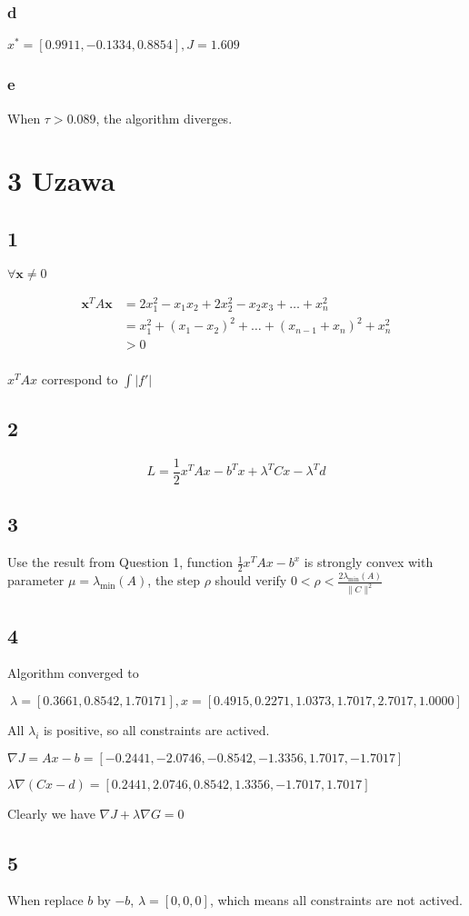\documentclass{article}
\begin{document}
\subsubsection*{d}
$x^* = [0.9911,   -0.1334,    0.8854], J=1.609$
\subsubsection*{e}
When $\tau > 0.089$, the algorithm diverges.
\section*{3 Uzawa}
\subsection*{1}
$\forall \mathbf{x}\neq 0$ 

\begin{equation*}
\begin{split}
\mathbf{x}^T A \mathbf{x} &= 2x_1^2 - x_1x_2 +2x_2^2 - x_2x_3+\dots+x_n^2\\
&= x_1^2 + (x_1-x_2)^2 + \dots + (x_{n-1}+x_n)^2 + x_n^2\\
&> 0\\
\end{split}
\end{equation*}

$x^TAx$ correspond to $\int | f' |$
\subsection*{2}
\begin{equation*}
L = \frac{1}{2} x^TAx - b^Tx +\lambda^TCx-\lambda^Td
\end{equation*}

\subsection*{3}
Use the result from Question 1, function $\frac{1}{2}x^TAx-b^x$ is strongly convex with parameter $\mu=\lambda_{\text{min}}(A)$, the step $\rho$ should verify $0<\rho<\frac{2\lambda_{\text{min}}(A)}{\lVert C\rVert^2}$

\subsection*{4}
Algorithm converged to

$$
\lambda = [0.3661, 0.8542, 1.70171], x = [0.4915,0.2271,    1.0373,    1.7017,    2.7017,    1.0000
]
$$

All $\lambda_i$ is positive, so all constraints are actived.

$\nabla J = Ax-b= [-0.2441,   -2.0746,   -0.8542,   -1.3356,    1.7017,   -1.7017]$

$\lambda \nabla (Cx-d) = [0.2441,    2.0746,    0.8542,    1.3356,   -1.7017,    1.7017]$

Clearly we have $\nabla J + \lambda \nabla G = 0$

\subsection*{5}
When replace $b$ by $-b$, $\lambda=[0,0,0]$, which means all constraints are not actived.
\end{document}

